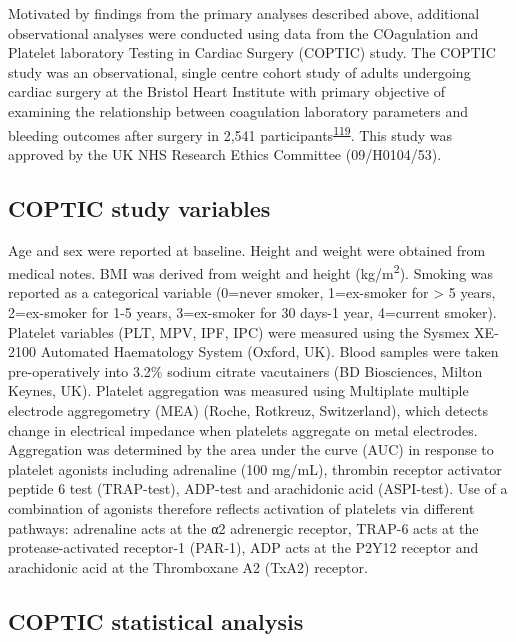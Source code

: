 \documentclass[11pt,twoside]{bristolthesis}
\begin{document}
Motivated by findings from the primary analyses described above, additional observational analyses were conducted using data from the COagulation and Platelet laboratory Testing in Cardiac Surgery (COPTIC) study. The COPTIC study was an observational, single centre cohort study of adults undergoing cardiac surgery at the Bristol Heart Institute with primary objective of examining the relationship between coagulation laboratory parameters and bleeding outcomes after surgery in 2,541 participants\textsuperscript{\protect\hyperlink{ref-Mumford2017}{119}}. This study was approved by the UK NHS Research Ethics Committee (09/H0104/53).

\hypertarget{coptic-study-variables}{%
\subsection{COPTIC study variables}\label{coptic-study-variables}}

Age and sex were reported at baseline. Height and weight were obtained from medical notes. BMI was derived from weight and height (kg/m\textsuperscript{2}). Smoking was reported as a categorical variable (0=never smoker, 1=ex-smoker for \textgreater{} 5 years, 2=ex-smoker for 1-5 years, 3=ex-smoker for 30 days-1 year, 4=current smoker). Platelet variables (PLT, MPV, IPF, IPC) were measured using the Sysmex XE-2100 Automated Haematology System (Oxford, UK). Blood samples were taken pre-operatively into 3.2\% sodium citrate vacutainers (BD Biosciences, Milton Keynes, UK). Platelet aggregation was measured using Multiplate multiple electrode aggregometry (MEA) (Roche, Rotkreuz, Switzerland), which detects change in electrical impedance when platelets aggregate on metal electrodes. Aggregation was determined by the area under the curve (AUC) in response to platelet agonists including adrenaline (100 mg/mL), thrombin receptor activator peptide 6 test (TRAP-test), ADP-test and arachidonic acid (ASPI-test). Use of a combination of agonists therefore reflects activation of platelets via different pathways: adrenaline acts at the α2 adrenergic receptor, TRAP-6 acts at the protease-activated receptor-1 (PAR-1), ADP acts at the P2Y12 receptor and arachidonic acid at the Thromboxane A2 (TxA2) receptor.

\hypertarget{coptic-statistical-analysis}{%
\subsection{COPTIC statistical analysis}\label{coptic-statistical-analysis}}
\end{document}
